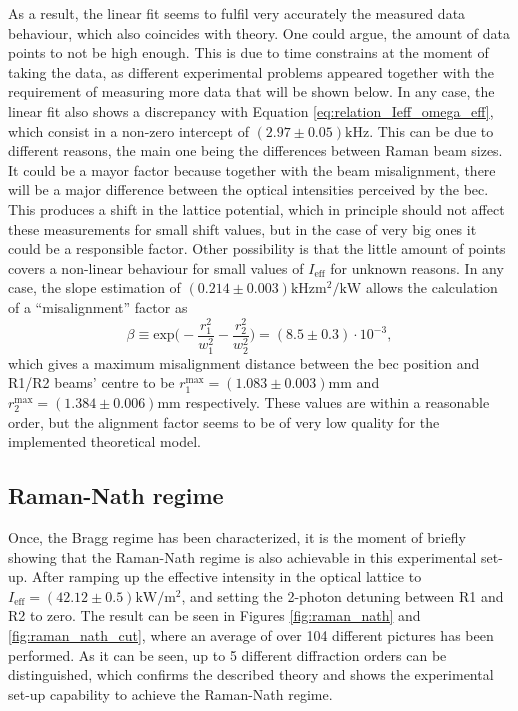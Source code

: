 As a result, the linear fit seems to fulfil very accurately the measured data behaviour, which also coincides with theory. One could argue, the amount of data points to not be high enough. This is due to time constrains at the moment of taking the data, as different experimental problems appeared together with the requirement of measuring more data that will be shown below. In any case, the linear fit also shows a discrepancy with Equation \eqref{eq:relation_Ieff_omega_eff}, which consist in a non-zero intercept of $(2.97\pm0.05)\si{\kilo\hertz}$. This can be due to different reasons, the main one being the differences between Raman beam sizes. It could be a mayor factor because together with the beam misalignment, there will be a major difference between the optical intensities perceived by the \ac{bec}. This produces a shift in the lattice potential, which in principle should not affect these measurements for small shift values, but in the case of very big ones it could be a responsible factor. Other possibility is that the little amount of points covers a non-linear behaviour for small values of $I_\text{eff}$ for unknown reasons. In any case, the slope estimation of $(0.214\pm0.003)\si{\kilo\hertz\meter\squared\per\kilo\watt}$ allows the calculation of a ``misalignment'' factor as
\begin{equation*}
	\beta \equiv \text{exp}\bigg(-\frac{r_1^2}{w_1^2}-\frac{r_2^2}{w_2^2}\bigg) = (8.5\pm0.3)\cdot10^{-3},
\end{equation*}
which gives a maximum misalignment distance between the \ac{bec} position and R1/R2 beams' centre to be $r_1^\text{max} = (1.083 \pm 0.003) \si{\milli\meter}$ and  $r_2^\text{max} = (1.384\pm0.006) \si{\milli\meter}$ respectively. These values are within a reasonable order, but the alignment factor seems to be of very low quality for the implemented theoretical model.

\pagebreak

\subsection{Raman-Nath regime}

Once, the Bragg regime has been characterized, it is the moment of briefly showing that the Raman-Nath regime is also achievable in this experimental set-up. After ramping up the effective intensity in the optical lattice to $I_\text{eff} = (42.12 \pm 0.5)\si{\kilo\watt\per\meter\squared}$, and setting the 2-photon detuning between R1 and R2 to zero. The result can be seen in Figures \ref{fig:raman_nath} and \ref{fig:raman_nath_cut}, where an average of over 104 different pictures has been performed. As it can be seen, up to 5 different diffraction orders can be distinguished, which confirms the described theory and shows the experimental set-up capability to achieve the Raman-Nath regime.

